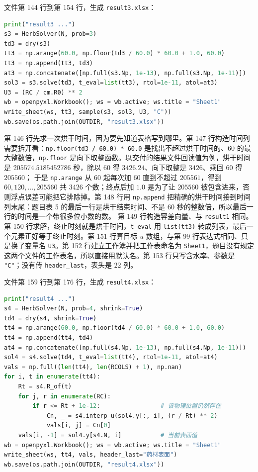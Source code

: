 文件第 144 行到第 154 行，生成 \texttt{result3.xlsx}：

\begin{lstlisting}[language=Python]
print("result3 ...")
s3 = HerbSolver(N, prob=3)
td3 = dry(s3)
tt3 = np.arange(60.0, np.floor(td3 / 60.0) * 60.0 + 1.0, 60.0)
tt3 = np.append(tt3, td3)
at3 = np.concatenate([np.full(s3.Np, 1e-13), np.full(s3.Np, 1e-11)])
sol3 = s3.solve(td3, t_eval=list(tt3), rtol=1e-11, atol=at3)
U3 = (RC / cm.R0) ** 2
wb = openpyxl.Workbook(); ws = wb.active; ws.title = "Sheet1"
write_sheet(ws, tt3, sample(s3, sol3, U3, "C"))
wb.save(os.path.join(OUTDIR, "result3.xlsx"))
\end{lstlisting}

第 146 行先求一次烘干时间，因为要先知道表格写到哪里。第 147 行构造时间列需要拆开看：\texttt{np.floor(td3 / 60.0) * 60.0} 是找出不超过烘干时间的、$60$ 的最大整数倍，\texttt{np.floor} 是向下取整函数。以交付的结果文件回读值为例，烘干时间是 $205574.5185452786$ 秒，除以 $60$ 得 $3426.24$、向下取整是 $3426$、乘回 $60$ 得 $205560$；
于是 \texttt{np.arange} 从 $60$ 起每次加 $60$ 直到不超过 $205561$，得到 $60,120,\dots,205560$ 共 $3426$ 个数；终点后加 $1.0$ 是为了让 $205560$ 被包含进来，否则浮点误差可能把它排除掉。第 148 行用 \texttt{np.append} 把精确的烘干时间接到时间列末尾：题目表 5 的最后一行是烘干结束时间、不是 $60$ 秒的整数倍，所以最后一行的时间是一个带很多位小数的数。
第 149 行构造容差向量、与 \texttt{result1} 相同。第 150 行求解，终止时刻就是烘干时间，\texttt{t\_eval} 用 \texttt{list(tt3)} 转成列表，最后一个元素正好等于终止时刻。第 151 行算目标 $u$ 数组，与第 99 行表达式相同、只是换了变量名 \texttt{U3}。第 152 行建立工作簿并把工作表命名为 \texttt{Sheet1}，题目没有规定这两个文件的工作表名，所以直接用默认名。第 153 行只写含水率、参数是 \texttt{"C"}；没有传 \texttt{header\_last}，表头是 $22$ 列。

文件第 159 行到第 176 行，生成 \texttt{result4.xlsx}：

\begin{lstlisting}[language=Python]
print("result4 ...")
s4 = HerbSolver(N, prob=4, shrink=True)
td4 = dry(s4, shrink=True)
tt4 = np.arange(60.0, np.floor(td4 / 60.0) * 60.0 + 1.0, 60.0)
tt4 = np.append(tt4, td4)
at4 = np.concatenate([np.full(s4.Np, 1e-13), np.full(s4.Np, 1e-11)])
sol4 = s4.solve(td4, t_eval=list(tt4), rtol=1e-11, atol=at4)
vals = np.full((len(tt4), len(RCOLS) + 1), np.nan)
for i, t in enumerate(tt4):
    Rt = s4.R_of(t)
    for j, r in enumerate(RC):
        if r <= Rt + 1e-12:                 # 该物理位置仍然存在
            Cn, _ = s4.interp_u(sol4.y[:, i], (r / Rt) ** 2)
            vals[i, j] = Cn[0]
    vals[i, -1] = sol4.y[s4.N, i]           # 当前表面值
wb = openpyxl.Workbook(); ws = wb.active; ws.title = "Sheet1"
write_sheet(ws, tt4, vals, header_last="药材表面")
wb.save(os.path.join(OUTDIR, "result4.xlsx"))
\end{lstlisting}

